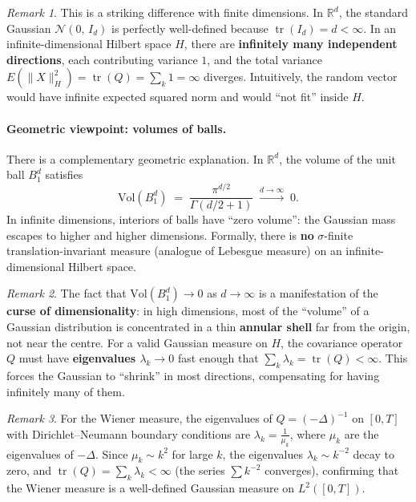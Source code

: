 \documentclass[11pt]{article}
\theoremstyle{definition}
\theoremstyle{remark}
\newtheorem{remark}{Remark}
\DeclareMathOperator{\tr}{tr}
\begin{document}
\begin{remark}
This is a striking difference with finite dimensions.
In $\mathbb{R}^d$, the standard Gaussian $\mathcal{N}(0,\, I_d)$
is perfectly well-defined because
$\tr(I_d) = d < \infty$.
In an infinite-dimensional Hilbert space $H$, there are
\textbf{infinitely many independent directions}, each contributing
variance $1$, and the total variance
$E(\|X\|_H^2) = \tr(Q) = \sum_k 1 = \infty$
diverges.
Intuitively, the random vector would have infinite expected
squared norm and would ``not fit'' inside $H$.
\end{remark}

\paragraph{Geometric viewpoint: volumes of balls.}

There is a complementary geometric explanation.
In $\mathbb{R}^d$, the volume of the unit ball $B_1^d$ satisfies
\[
    \mathrm{Vol}(B_1^d)
    \;=\;
    \frac{\pi^{d/2}}{\Gamma(d/2 + 1)}
    \;\xrightarrow{d \to \infty}\;
    0.
\]
In infinite dimensions, interiors of balls have ``zero volume'':
the Gaussian mass escapes to higher and higher dimensions.
Formally, there is \textbf{no} $\sigma$-finite translation-invariant
measure (analogue of Lebesgue measure) on an infinite-dimensional
Hilbert space.

\begin{remark}
The fact that $\mathrm{Vol}(B_1^d) \to 0$ as $d \to \infty$
is a manifestation of the \textbf{curse of dimensionality}:
in high dimensions, most of the ``volume'' of a Gaussian
distribution is concentrated in a thin \textbf{annular shell}
far from the origin, not near the centre.
For a valid Gaussian measure on $H$, the covariance operator $Q$
must have \textbf{eigenvalues $\lambda_k \to 0$} fast enough
that $\sum_k \lambda_k = \tr(Q) < \infty$.
This forces the Gaussian to ``shrink'' in most directions,
compensating for having infinitely many of them.
\end{remark}

\begin{remark}
For the Wiener measure, the eigenvalues of $Q = (-\Delta)^{-1}$
on $[0,T]$ with Dirichlet--Neumann boundary conditions are
$\lambda_k = \frac{1}{\mu_k}$, where $\mu_k$ are the eigenvalues
of $-\Delta$.  Since $\mu_k \sim k^2$ for large $k$, the eigenvalues
$\lambda_k \sim k^{-2}$ decay to zero, and
$\tr(Q) = \sum_k \lambda_k < \infty$
(the series $\sum k^{-2}$ converges), confirming that the Wiener
measure is a well-defined Gaussian measure on $L^2([0,T])$.
\end{remark}
\end{document}
